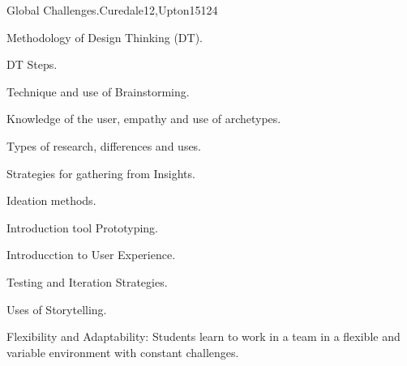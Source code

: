 \begin{syllabus}
\begin{unit}{Global Challenges.}{}{Curedale12,Upton15}{12}{4}
   \begin{topics}
      \item Methodology of Design Thinking (DT).
      \item DT Steps.
      \item Technique and use of Brainstorming.
      \item Knowledge of the user, empathy and use of archetypes.
      \item Types of research, differences and uses.
      \item Strategies for gathering from Insights.
      \item Ideation methods.
      \item Introduction tool Prototyping.
      \item Introducction to User Experience.
      \item Testing and Iteration Strategies.
      \item Uses of Storytelling.
   \end{topics}
   \begin{learningoutcomes}
      \item Flexibility and Adaptability: Students learn to work in a team in a flexible and variable environment with constant challenges.
   \end{learningoutcomes}
\end{unit}

\begin{coursebibliography}
\end{coursebibliography}

\end{syllabus}
